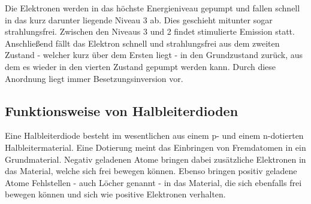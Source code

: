Die Elektronen werden in das höchste Energieniveau \dq gepumpt\dq{} und fallen schnell in das kurz darunter liegende Niveau 3 ab. Dies geschieht mitunter sogar strahlungsfrei.
Zwischen den Niveaus 3 und 2 findet stimulierte Emission statt. Anschließend fällt das Elektron schnell und strahlungsfrei aus dem zweiten Zustand - welcher kurz über dem Ersten
liegt - in den Grundzustand zurück, aus dem es wieder in den vierten Zustand gepumpt werden kann. Durch diese Anordnung liegt immer Besetzungsinversion vor.

\subsection{Funktionsweise von Halbleiterdioden}
Eine Halbleiterdiode besteht im wesentlichen aus einem p- und einem n-dotierten Halbleitermaterial. Eine \glqq Dotierung\grqq{} meint das Einbringen von Fremdatomen in ein
Grundmaterial. Negativ geladenen Atome bringen dabei zusätzliche Elektronen in das Material, welche sich frei bewegen können. Ebenso bringen positiv geladene Atome 
\dq Fehlstellen\dq{} - auch Löcher genannt - in das Material, die sich ebenfalls frei bewegen können und sich wie positive Elektronen verhalten.
